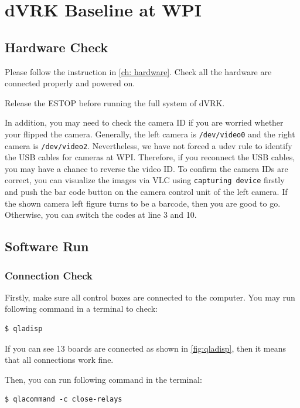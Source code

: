 \chapter{dVRK Baseline at WPI}
\label{ch: baseline}

\section{Hardware Check}

Please follow the instruction in \autoref{ch: hardware}. Check all the hardware are connected properly and powered on.

Release the ESTOP before running the full system of dVRK.

In addition, you may need to check the camera ID if you are worried whether your flipped the camera. Generally, the left camera is \texttt{\slash dev\slash video0} and the right camera is \texttt{\slash dev\slash video2}. Nevertheless, we have not forced a udev rule to identify the USB cables for cameras at WPI. Therefore, if you reconnect the USB cables, you may have a chance to reverse the video ID. To confirm the camera IDs are correct, you can visualize the images via VLC using \texttt{capturing device} firstly and push the bar code button on the camera control unit of the left camera. If the shown camera left figure turns to be a barcode, then you are good to go. Otherwise, you can switch the codes at line
3 and 10.

\section{Software Run}

\subsection{Connection Check}

Firstly, make sure all control boxes are connected to the computer. You may run following command in a terminal to check:

\begin{verbatim}
$ qladisp
\end{verbatim}

If you can see 13 boards are connected as shown in \autoref{fig:qladisp}, then it means that all connections work fine. 

Then, you can run following command in the terminal:

\begin{verbatim}
$ qlacommand -c close-relays
\end{verbatim}

